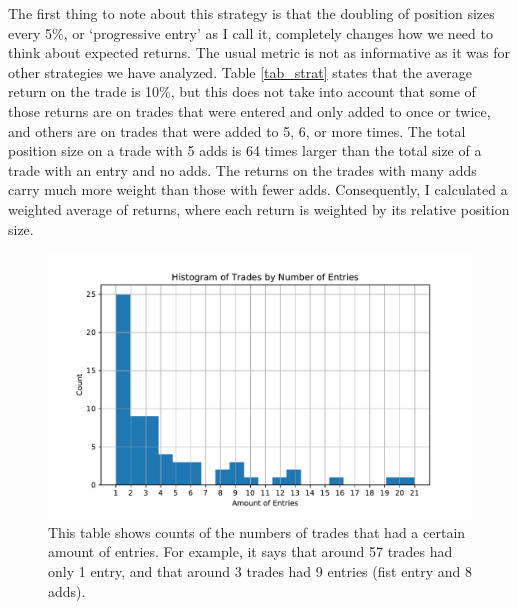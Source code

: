\documentclass{article}
\begin{document}
The first thing to note about this strategy is that the doubling of position sizes every 5\%, or `progressive entry' as I call it, completely changes how we need to think about expected returns. The usual metric is not as informative as it was for other strategies we have analyzed. Table \ref{tab_strat} states that the average return on the trade is 10\%, but this does not take into account that some of those returns are on trades that were entered and only added to once or twice, and others are on trades that were added to 5, 6, or more times. The total position size on a trade with 5 adds is 64 times larger than the total size of a trade with an entry and no adds. The returns on the trades with many adds carry much more weight than those with fewer adds. Consequently, I calculated a weighted average of returns, where each return is weighted by its relative position size. 

\begin{figure}
	\includegraphics[width=\textwidth]{prog_entry_hist.pdf}
	\caption{This table shows counts of the numbers of trades that had a certain amount of entries. For example, it says that around 57 trades had only 1 entry, and that around 3 trades had 9 entries (fist entry and 8 adds).}
	\label{hist_strat}
	\end{figure}
\end{document}
